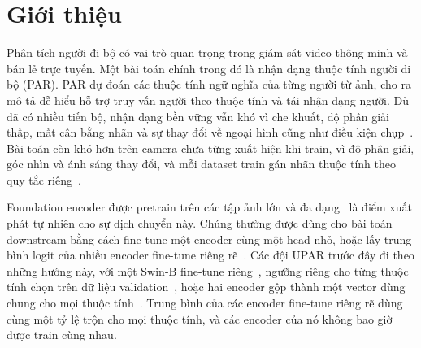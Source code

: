 \documentclass[10pt,twocolumn,letterpaper]{article}
\begin{document}
\section{Giới thiệu}
\label{sec:intro}

Phân tích người đi bộ có vai trò quan trọng trong giám sát video thông minh và bán lẻ trực tuyến. Một bài toán chính trong đó là nhận dạng thuộc tính người đi bộ (PAR). PAR dự đoán các thuộc tính ngữ nghĩa của từng người từ ảnh, cho ra mô tả dễ hiểu hỗ trợ truy vấn người theo thuộc tính và tái nhận dạng người. Dù đã có nhiều tiến bộ, nhận dạng bền vững vẫn khó vì che khuất, độ phân giải thấp, mất cân bằng nhãn và sự thay đổi về ngoại hình cũng như điều kiện chụp~\cite{rap,upar,labelbalanced}. Bài toán còn khó hơn trên camera chưa từng xuất hiện khi train, vì độ phân giải, góc nhìn và ánh sáng thay đổi, và mỗi dataset train gán nhãn thuộc tính theo quy tắc riêng~\cite{upar}.

Foundation encoder được pretrain trên các tập ảnh lớn và đa dạng~\cite{dinov3,clip} là điểm xuất phát tự nhiên cho sự dịch chuyển này. Chúng thường được dùng cho bài toán downstream bằng cách fine-tune một encoder cùng một head nhỏ, hoặc lấy trung bình logit của nhiều encoder fine-tune riêng rẽ~\cite{deepens}. Các đội UPAR trước đây đi theo những hướng này, với một Swin-B fine-tune riêng~\cite{upar23}, ngưỡng riêng cho từng thuộc tính chọn trên dữ liệu validation~\cite{upar24}, hoặc hai encoder gộp thành một vector dùng chung cho mọi thuộc tính~\cite{c2tnet}. Trung bình của các encoder fine-tune riêng rẽ dùng cùng một tỷ lệ trộn cho mọi thuộc tính, và các encoder của nó không bao giờ được train cùng nhau.
\end{document}
